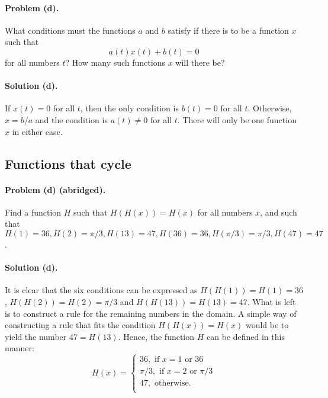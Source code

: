 \documentclass{article}
\begin{document}
\paragraph{Problem (d).} What conditions must the functions $a$ and $b$ satisfy if there is to be a function $x$ such that \begin{equation*}
  a(t)x(t) + b(t) = 0
\end{equation*} for all numbers $t$? How many such functions $x$ will there be?

\paragraph{Solution (d).} If $x(t) = 0$ for all $t$, then the only condition is $b(t) = 0$ for all $t$. Otherwise, $x = b/a$ and the condition is $a(t) \neq 0$ for all $t$. There will only be one function $x$ in either case.

\setcounter{subsection}{10}
\subsection{Functions that cycle}

\paragraph{Problem (d) (abridged).} Find a function $H$ such that $H(H(x)) = H(x)$ for all numbers $x$, and such that $H(1) = 36, H(2) = \pi/3, H(13) = 47, H(36) = 36, H(\pi/3) = \pi/3, H(47) = 47$.

\paragraph{Solution (d).} It is clear that the six conditions can be expressed as $H(H(1)) = H(1) = 36$, $H(H(2)) = H(2) = \pi/3$ and $H(H(13)) = H(13) = 47$. What is left is to construct a rule for the remaining numbers in the domain. A simple way of constructing a rule that fits the condition $H(H(x)) = H(x)$ would be to yield the number $47 = H(13)$. Hence, the function $H$ can be defined in this manner: \begin{equation*}
  H(x) = \begin{cases}
    36, \text{ if } x = 1 \text{ or } 36 \\
    \pi/3, \text{ if } x = 2 \text{ or } \pi/3 \\
    47, \text{ otherwise.} \\
  \end{cases}
\end{equation*}
\end{document}
